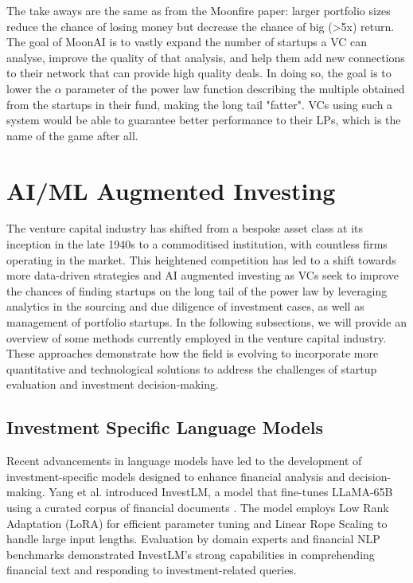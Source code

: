 \documentclass[a4paper, oneside]{discothesis}
\begin{document}
The take aways are the same as from the Moonfire paper: larger portfolio sizes reduce the chance of losing money but decrease the chance of big (>5x) return. The goal of MoonAI is to vastly expand the number of startups a VC can analyse, improve the quality of that analysis, and help them add new connections to their network that can provide high quality deals. In doing so, the goal is to lower the $\alpha$ parameter of the power law function describing the multiple obtained from the startups in their fund, making the long tail "fatter". VCs using such a system would be able to guarantee better performance to their LPs, which is the name of the game after all. 

\pagebreak


\section{AI/ML Augmented Investing}
The venture capital industry has shifted from a bespoke asset class at its inception in the late 1940s to a commoditised institution, with countless firms operating in the market. This heightened competition has led to a shift towards more data-driven strategies and AI augmented investing as VCs seek to improve the chances of finding startups on the long tail of the power law by leveraging analytics in the sourcing and due diligence of investment cases, as well as management of portfolio startups. In the following subsections, we will provide an overview of some methods currently employed in the venture capital industry. These approaches demonstrate how the field is evolving to incorporate more quantitative and technological solutions to address the challenges of startup evaluation and investment decision-making.

\subsection{Investment Specific Language Models}
Recent advancements in language models have led to the development of investment-specific models designed to enhance financial analysis and decision-making. Yang et al. introduced InvestLM, a model that fine-tunes LLaMA-65B using a curated corpus of financial documents \cite{yang2023investlm}. The model employs Low Rank Adaptation (LoRA) for efficient parameter tuning and Linear Rope Scaling to handle large input lengths. Evaluation by domain experts and financial NLP benchmarks demonstrated InvestLM's strong capabilities in comprehending financial text and responding to investment-related queries.
\end{document}

